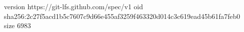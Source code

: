 version https://git-lfs.github.com/spec/v1
oid sha256:2c27f5acd1b5c7607c9d66e455af3259f463320d014c3c619ead45b61fa7feb0
size 6983
